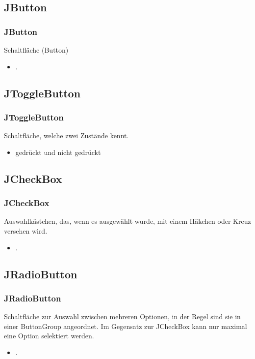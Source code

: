 \documentclass[xcolor=dvipsnames]{beamer}
\begin{document}
\subsection{JButton}
\begin{frame} %
  \frametitle{JButton} %
  \begin{block}{Schaltfläche (Button)}
	  \begin{itemize}
		\item .
	  \end{itemize}
  \end{block}
\end{frame}

\subsection{JToggleButton}
\begin{frame} %
  \frametitle{JToggleButton} %
  \begin{block}{Schaltfläche, welche zwei Zustände kennt.}
	  \begin{itemize}
		\item gedrückt und nicht gedrückt
	  \end{itemize}
  \end{block}
\end{frame}

\subsection{JCheckBox}
\begin{frame} %
  \frametitle{JCheckBox} %
  \begin{block}{Auswahlkästchen, das, wenn es ausgewählt wurde, mit einem Häkchen oder Kreuz versehen wird.}
	  \begin{itemize}
		\item .
	  \end{itemize}
  \end{block}
\end{frame}

\subsection{JRadioButton}
\begin{frame} %
  \frametitle{JRadioButton} %
  \begin{block}{Schaltfläche zur Auswahl zwischen mehreren Optionen, in der Regel sind sie in einer ButtonGroup angeordnet. Im Gegensatz zur JCheckBox kann nur maximal eine Option selektiert werden.}
	  \begin{itemize}
		\item .
	  \end{itemize}
  \end{block}
\end{frame}
\end{document}
